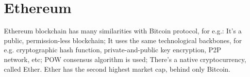 
\section{Ethereum}

Ethereum blockchain has many similarities with Bitcoin protocol, for e.g.: It’s a public, permission-less blockchain; It uses the same technological backbones, for e.g. cryptographic hash function, private-and-public key encryption, P2P network, etc; POW consensus algorithm is used; There’s a native cryptocurrency, called Ether. Ether has the second highest market cap, behind only Bitcoin.

